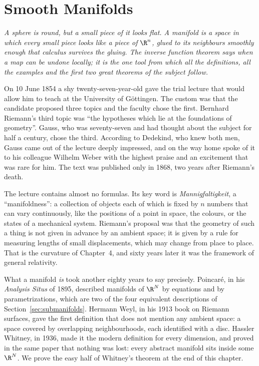\chapter{Smooth Manifolds}

\begin{center}\itshape
A sphere is round, but a small piece of it looks flat. A manifold is a space in which every small piece looks like a piece of $\R^n$, glued to its
neighbours smoothly enough that calculus survives the gluing. The inverse function theorem says when a map can be undone locally; it is the one tool from
which all the definitions, all the examples and the first two great theorems of the subject follow.
\end{center}

On 10 June 1854 a shy twenty-seven-year-old gave the trial lecture that would allow him to teach at the University of G\"ottingen. The custom was that
the candidate proposed three topics and the faculty chose the first. Bernhard Riemann's third topic was ``the hypotheses which lie at the foundations of
geometry''. Gauss, who was seventy-seven and had thought about the subject for half a century, chose the third. According to Dedekind, who knew both men,
Gauss came out of the lecture deeply impressed, and on the way home spoke of it to his colleague Wilhelm Weber with the highest praise and an excitement
that was rare for him. The text was published only in 1868, two years after Riemann's death.

The lecture contains almost no formulas. Its key word is \emph{Mannigfaltigkeit}, a ``manifoldness'': a collection of objects each of which is fixed by
$n$ numbers that can vary continuously, like the positions of a point in space, the colours, or the states of a mechanical system. Riemann's proposal was
that the geometry of such a thing is not given in advance by an ambient space; it is given by a rule for measuring lengths of small displacements, which
may change from place to place. That is the curvature of Chapter~4, and sixty years later it was the framework of general relativity.

What a manifold \emph{is} took another eighty years to say precisely. Poincar\'e, in his \emph{Analysis Situs} of 1895, described manifolds of $\R^N$ by
equations and by parametrizations, which are two of the four equivalent descriptions of Section~\ref{sec:submanifolds}. Hermann Weyl, in his 1913 book
on Riemann surfaces, gave the first definition that does not mention any ambient space: a space covered by overlapping neighbourhoods, each identified
with a disc. Hassler Whitney, in 1936, made it the modern definition for every dimension, and proved in the same paper that nothing was lost: every
abstract manifold sits inside some $\R^N$. We prove the easy half of Whitney's theorem at the end of this chapter.

